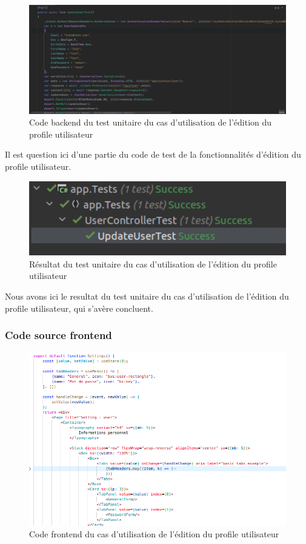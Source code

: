 \begin{figure}[H]
	\centering
	\includegraphics[width=1\textwidth]{img/utupdate}
	\caption{Code backend du test unitaire du cas d'utilisation de l'édition du profile utilisateur}
	\label{fig:mesh1}
\end{figure}

Il est question ici d'une partie du code de test de la fonctionnalités d'édition du profile utilisateur.

\begin{figure}[H]
	\centering
	\includegraphics[width=1\textwidth]{img/uutr}
	\caption{Résultat du test unitaire du cas d'utilisation de l'édition du profile utilisateur}
	\label{fig:mesh1}
\end{figure}

Nous avons ici le resultat du test unitaire du cas d'utilisation de l'édition du profile utilisateur, qui s'avère concluent.

\subsubsection{Code source frontend}

\begin{figure}[H]
	\centering
	\includegraphics[width=1\textwidth]{img/fuu}
	\caption{Code frontend du cas d'utilisation de l'édition du profile utilisateur}
	\label{fig:mesh1}
\end{figure}

